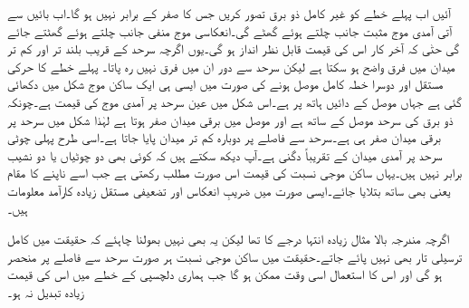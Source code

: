 آئیں اب پہلے خطے کو غیر کامل ذو برق تصور کریں جس کا  صفر کے برابر نہیں ہو گا۔اب بائیں سے آتی آمدی موج مثبت  جانب چلتے ہوئے گھٹے گی۔انعکاسی موج منفی  جانب چلتے ہوئے گھٹتے جائے گی حتٰی کہ آخر کار اس کی قیمت قابل نظر انداز ہو گی۔یوں اگرچہ سرحد کے قریب بلند تر اور کم تر میدان میں فرق  واضح ہو سکتا ہے لیکن سرحد سے دور ان میں فرق نہیں رہ پاتا۔ پہلے خطے کا حرکی مستقل  اور دوسرا خطہ کامل موصل ہونے کی صورت میں ایسی ہی ایک ساکن موج شکل  میں دکھائی گئی ہے جہاں موصل  کے دائیں ہاتھ پر ہے۔اس شکل میں عین سرحد پر آمدی
 موج کی قیمت  ہے۔چونکہ ذو برق کی سرحد موصل کے ساتھ ہے اور موصل میں برقی میدان صفر ہوتا ہے لہٰذا شکل میں سرحد پر برقی میدان صفر ہی ہے۔سرحد سے  فاصلے پر دوبارہ کم تر میدان پایا جاتا ہے۔اسی طرح  پہلی چوٹی سرحد پر آمدی میدان کے تقریباً  دگنی ہے۔آپ دیکھ سکتے ہیں کہ کوئی بھی دو چوٹیاں یا دو نشیب برابر نہیں ہیں۔یہاں ساکن موجی نسبت کی قیمت اس صورت مطلب رکھتی ہے جب اسے ناپنے کا مقام یعنی  بھی ساتھ بتلایا جائے۔ایسی صورت میں ضریبِ انعکاس اور تضعیفی مستقل زیادہ کارآمد معلومات ہیں۔

اگرچہ مندرجہ بالا مثال زیادہ انتہا درجے کا تھا لیکن یہ بھی نہیں بھولنا چاہئے کہ حقیقت میں کامل ترسیلی تار بھی نہیں پائے جاتے۔حقیقت میں ساکن موجی نسبت ہر صورت سرحد سے فاصلے پر منحصر ہو گی اور اس کا استعمال اسی وقت ممکن ہو گا جب ہماری دلچسپی کے خطے میں اس کی قیمت زیادہ تبدیل نہ ہو۔   

